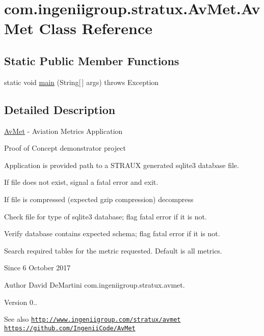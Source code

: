 \hypertarget{classcom_1_1ingeniigroup_1_1stratux_1_1_av_met_1_1_av_met}{}\section{com.\+ingeniigroup.\+stratux.\+Av\+Met.\+Av\+Met Class Reference}
\label{classcom_1_1ingeniigroup_1_1stratux_1_1_av_met_1_1_av_met}
\subsection*{Static Public Member Functions}
\begin{DoxyCompactItemize}
\item 
static void \hyperlink{classcom_1_1ingeniigroup_1_1stratux_1_1_av_met_1_1_av_met_ae763fd652baed7ceb7e46db6c7062837}{main} (String\mbox{[}$\,$\mbox{]} args)  throws Exception 
\end{DoxyCompactItemize}


\subsection{Detailed Description}
\hyperlink{classcom_1_1ingeniigroup_1_1stratux_1_1_av_met_1_1_av_met}{Av\+Met} -\/ Aviation Metrics Application

Proof of Concept demonstrator project

Application is provided path to a S\+T\+R\+A\+UX generated sqlite3 database file.

If file does not exist, signal a fatal error and exit.

If file is compressed (expected gzip compression) decompress

Check file for type of sqlite3 database; flag fatal error if it is not.

Verify database contains expected schema; flag fatal error if it is not.

Search required tables for the metric requested. Default is all metrics.

\begin{DoxySince}{Since}
6 October 2017 
\end{DoxySince}
\begin{DoxyAuthor}{Author}
David De\+Martini  com.\+ingeniigroup.\+stratux.\+avmet. 
\end{DoxyAuthor}
\begin{DoxyVersion}{Version}
0.. 
\end{DoxyVersion}
\begin{DoxySeeAlso}{See also}
\href{http://www.ingeniigroup.com/stratux/avmet}{\tt http\+://www.\+ingeniigroup.\+com/stratux/avmet}  \href{https://github.com/IngeniiCode/AvMet}{\tt https\+://github.\+com/\+Ingenii\+Code/\+Av\+Met} 
\end{DoxySeeAlso}


